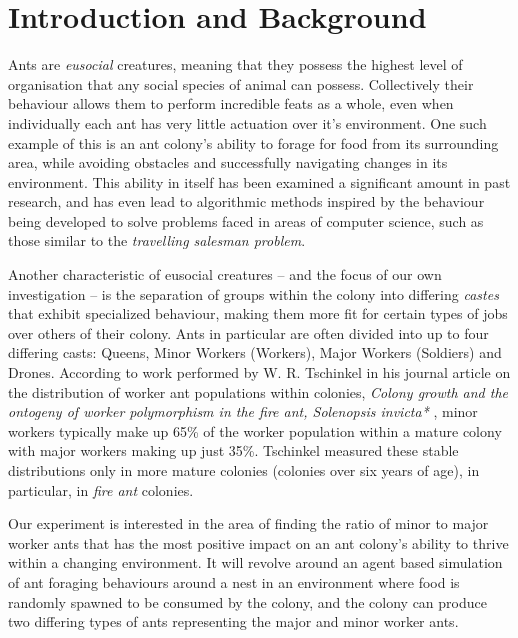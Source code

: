 \section{Introduction and Background}
		
    Ants are \textit{eusocial} creatures, meaning that they possess the highest level of organisation that any social species of animal can possess\cite{wilson_insect_1971, hadley_what_nodate}. Collectively their behaviour allows them to perform
    incredible feats as a whole, even when individually each ant has very little actuation over it's environment. One such example of this is an ant colony's ability to forage for food from its surrounding area, while avoiding
    obstacles and successfully navigating changes in its environment. This ability in itself has been examined a significant amount in past research\cite{vittori_modeling_2004, a_panait_ant_2004}, and has even lead to algorithmic
    methods inspired by the behaviour being developed to solve problems faced in areas of computer science, such as those similar to the \textit{travelling salesman problem}\cite{dorigo_ant_2006, zhang_improved_2007}.

    Another characteristic of eusocial creatures -- and the focus of our own investigation -- is the separation of groups within the colony into differing \textit{castes} that exhibit specialized behaviour, making them more fit
    for certain types of jobs over others of their colony\cite{hadley_what_nodate}. Ants in particular are often divided into up to four differing casts: Queens, Minor Workers (Workers), Major Workers (Soldiers) and Drones\cite{noauthor_ant_nodate,noauthor_castes_nodate}.
    According to work performed by W. R. Tschinkel in his journal article on the distribution of worker ant populations within colonies, \textit{Colony growth and the ontogeny of worker polymorphism in the fire ant, Solenopsis invicta*} \cite{Tschinkel1988}, minor workers typically make up 65\% of the worker population within a mature colony with major workers making up just 35\%. Tschinkel measured these stable distributions only in more mature
    colonies (colonies over six years of age), in particular, in \textit{fire ant} colonies.

    Our experiment is interested in the area of finding the ratio of minor to major worker ants that has the most positive impact on an ant colony's ability to thrive within a changing environment. It will
    revolve around an agent based simulation of ant foraging behaviours around a nest in an environment where food is randomly spawned to be consumed by the colony, and the colony can produce two differing types of ants
    representing the major and minor worker ants.

